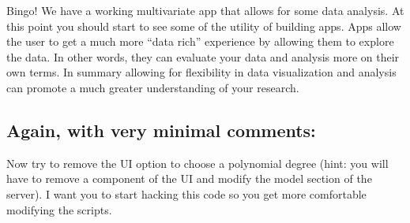 \documentclass[]{article}
\newenvironment{Shaded}{\begin{snugshade}}{\end{snugshade}}
\newcommand{\CommentTok}[1]{\textcolor[rgb]{0.56,0.35,0.01}{\textit{#1}}}
\newcommand{\DataTypeTok}[1]{\textcolor[rgb]{0.13,0.29,0.53}{#1}}
\newcommand{\DecValTok}[1]{\textcolor[rgb]{0.00,0.00,0.81}{#1}}
\newcommand{\KeywordTok}[1]{\textcolor[rgb]{0.13,0.29,0.53}{\textbf{#1}}}
\newcommand{\NormalTok}[1]{#1}
\newcommand{\OperatorTok}[1]{\textcolor[rgb]{0.81,0.36,0.00}{\textbf{#1}}}
\newcommand{\StringTok}[1]{\textcolor[rgb]{0.31,0.60,0.02}{#1}}
\begin{document}
\begin{Shaded}
\end{Shaded}

Bingo! We have a working multivariate app that allows for some data
analysis. At this point you should start to see some of the utility of
building apps. Apps allow the user to get a much more ``data rich''
experience by allowing them to explore the data. In other words, they
can evaluate your data and analysis more on their own terms. In summary
allowing for flexibility in data visualization and analysis can promote
a much greater understanding of your research.

\hypertarget{again-with-very-minimal-comments}{%
\subsection{Again, with very minimal
comments:}\label{again-with-very-minimal-comments}}

Now try to remove the UI option to choose a polynomial degree (hint: you
will have to remove a component of the UI and modify the model section
of the server). I want you to start hacking this code so you get more
comfortable modifying the scripts.
\end{document}

